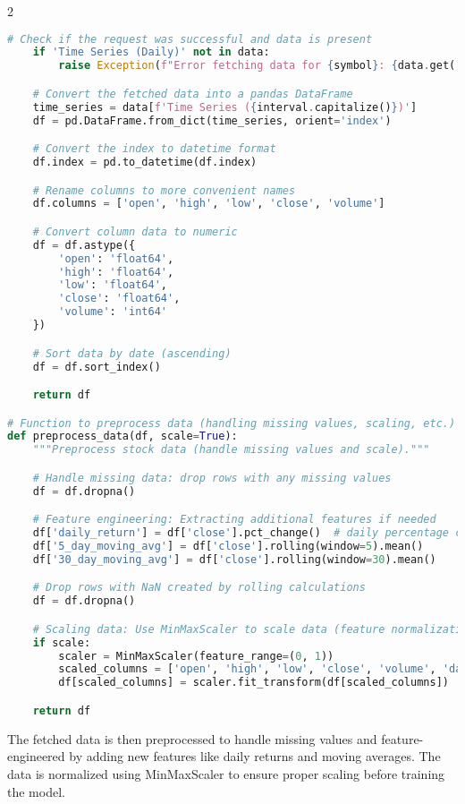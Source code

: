 \documentclass[12pt]{article}
\begin{document}
\begin{multicols}{2}
\begin{lstlisting}[language=Python, caption=Fetching and Preprocessing Stock Data]
    # Check if the request was successful and data is present
    if 'Time Series (Daily)' not in data:
        raise Exception(f"Error fetching data for {symbol}: {data.get('Note', 'Unknown error')}")

    # Convert the fetched data into a pandas DataFrame
    time_series = data[f'Time Series ({interval.capitalize()})']
    df = pd.DataFrame.from_dict(time_series, orient='index')

    # Convert the index to datetime format
    df.index = pd.to_datetime(df.index)

    # Rename columns to more convenient names
    df.columns = ['open', 'high', 'low', 'close', 'volume']

    # Convert column data to numeric
    df = df.astype({
        'open': 'float64',
        'high': 'float64',
        'low': 'float64',
        'close': 'float64',
        'volume': 'int64'
    })

    # Sort data by date (ascending)
    df = df.sort_index()

    return df

# Function to preprocess data (handling missing values, scaling, etc.)
def preprocess_data(df, scale=True):
    """Preprocess stock data (handle missing values and scale)."""

    # Handle missing data: drop rows with any missing values
    df = df.dropna()

    # Feature engineering: Extracting additional features if needed
    df['daily_return'] = df['close'].pct_change()  # daily percentage change in closing price
    df['5_day_moving_avg'] = df['close'].rolling(window=5).mean()
    df['30_day_moving_avg'] = df['close'].rolling(window=30).mean()

    # Drop rows with NaN created by rolling calculations
    df = df.dropna()

    # Scaling data: Use MinMaxScaler to scale data (feature normalization)
    if scale:
        scaler = MinMaxScaler(feature_range=(0, 1))
        scaled_columns = ['open', 'high', 'low', 'close', 'volume', 'daily_return', '5_day_moving_avg', '30_day_moving_avg']
        df[scaled_columns] = scaler.fit_transform(df[scaled_columns])

    return df
\end{lstlisting}

The fetched data is then preprocessed to handle missing values and feature-engineered by adding new features like daily returns and moving averages. The data is normalized using MinMaxScaler to ensure proper scaling before training the model.


\end{multicols}
\end{document}
